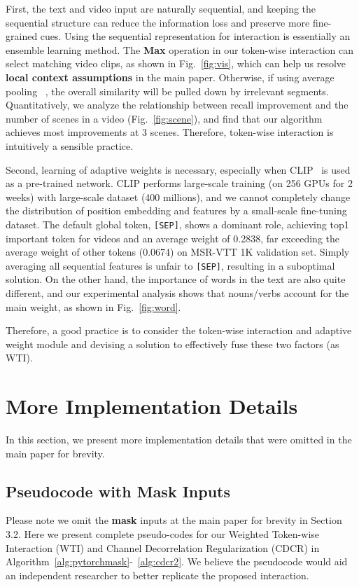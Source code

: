 \documentclass[runningheads]{llncs}
\begin{document}
First, the text and video input are naturally sequential, and keeping the sequential structure can reduce the information loss and preserve more fine-grained cues.
Using the sequential representation for interaction is essentially an ensemble learning method.
The \textbf{Max} operation in our token-wise interaction can select matching video clips, as shown in Fig.~\ref{fig:vis}, which can help us resolve \textbf{local context assumptions} in the main paper.
Otherwise, if using average pooling ~\cite{clip4clip}, the overall similarity will be pulled down by irrelevant segments.
Quantitatively, we analyze the relationship between recall improvement and the number of scenes in a video (Fig.~\ref{fig:scene}), and find that our algorithm achieves most improvements at 3 scenes.
Therefore, token-wise interaction is intuitively a sensible practice. 

Second, learning of adaptive weights is necessary, especially when CLIP~\cite{clip} is used as a pre-trained network.
CLIP performs large-scale training (on 256 GPUs for 2 weeks) with large-scale dataset (400 millions), and we cannot completely change the distribution of position embedding and features by a small-scale fine-tuning dataset.
The default global token, \texttt{[SEP]}, shows a dominant role, achieving top1 important token for  videos and an average weight of 0.2838, far exceeding the average weight of other tokens (0.0674) on MSR-VTT 1K validation set.
Simply averaging all sequential features is unfair to \texttt{[SEP]}, resulting in a suboptimal solution.
On the other hand, the importance of words in the text are also quite different, and our experimental analysis shows that nouns/verbs account for the main weight, as shown in Fig.~\ref{fig:word}.

Therefore, a good practice is to consider the token-wise interaction and adaptive weight module and devising a solution to effectively fuse these two factors (as WTI).



\section{More Implementation Details}
\label{sec:details}
In this section, we present more implementation details that were omitted in the main paper for brevity.

\subsection{Pseudocode with Mask Inputs}
Please note we omit the \textbf{mask} inputs at the main paper for brevity in Section 3.2. 
Here we present complete pseudo-codes for our Weighted Token-wise Interaction (WTI) and Channel Decorrelation Regularization (CDCR) in Algorithm~\ref{alg:pytorchmask}-~\ref{alg:cdcr2}.
We believe the pseudocode would aid an independent researcher to better replicate the proposed interaction. 
\end{document}
